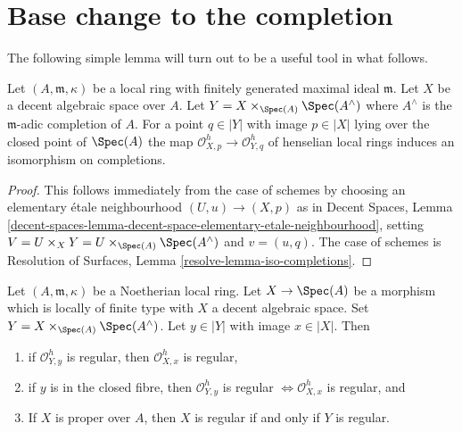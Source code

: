 \section{Base change to the completion}
\label{section-aux}

\noindent
The following simple lemma will turn out to be a useful tool in what follows.

\begin{lemma}
\label{lemma-iso-completions}
Let $(A, \mathfrak m, \kappa)$ be a local ring with finitely generated
maximal ideal $\mathfrak m$. Let $X$ be a decent algebraic
space over $A$. Let $Y = X \times_{\Spec(A)} \Spec(A^\wedge)$ where
$A^\wedge$ is the $\mathfrak m$-adic completion of $A$.
For a point $q \in |Y|$ with image $p \in |X|$ lying
over the closed point of $\Spec(A)$ the map
$\mathcal{O}_{X, p}^h \to \mathcal{O}_{Y, q}^h$
of henselian local rings induces an isomorphism on completions.
\end{lemma}

\begin{proof}
This follows immediately from the case of schemes by
choosing an elementary \'etale neighbourhood $(U, u) \to (X, p)$
as in Decent Spaces, Lemma
\ref{decent-spaces-lemma-decent-space-elementary-etale-neighbourhood},
setting $V = U \times_X Y = U \times_{\Spec(A)} \Spec(A^\wedge)$
and $v = (u, q)$.
The case of schemes is
Resolution of Surfaces, Lemma \ref{resolve-lemma-iso-completions}.
\end{proof}

\begin{lemma}
\label{lemma-port-regularity-to-completion}
Let $(A, \mathfrak m, \kappa)$ be a Noetherian local ring.
Let $X \to \Spec(A)$ be a morphism which is locally of finite type
with $X$ a decent algebraic space. Set
$Y = X \times_{\Spec(A)} \Spec(A^\wedge)$. Let $y \in |Y|$
with image $x \in |X|$. Then
\begin{enumerate}
\item if $\mathcal{O}_{Y, y}^h$ is regular, then
$\mathcal{O}_{X, x}^h$ is regular,
\item if $y$ is in the closed fibre, then $\mathcal{O}_{Y, y}^h$ is regular
$\Leftrightarrow \mathcal{O}_{X, x}^h$ is regular, and
\item If $X$ is proper over $A$, then $X$ is regular
if and only if $Y$ is regular.
\end{enumerate}
\end{lemma}

